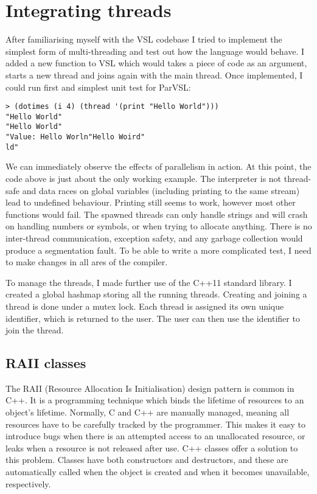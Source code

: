 \section{Integrating threads}
\label{sec:babythreads}
After familiarising myself with the VSL codebase I tried to implement the simplest form of
multi-threading and test out how the language would behave. I added a new function to VSL
which would takes a piece of code as an argument, starts a new thread and joins again with
the main thread. Once implemented, I could run first and simplest unit test for ParVSL:

\begin{verbatim}
> (dotimes (i 4) (thread '(print "Hello World")))
"Hello World"
"Hello World"
"Value: Hello Worln"Hello Woird"
ld"
\end{verbatim}

We can immediately observe the effects of parallelism in action. At this point, the code above
is just about the only working example. The interpreter is not thread-safe and data races
on global variables (including printing to the same stream) lead to undefined behaviour. Printing
still seems to work, however most other functions would fail. The spawned threads can only handle strings
and will crash on handling numbers or symbols, or when trying to allocate anything.
There is no inter-thread communication, exception safety, and any garbage collection would produce a segmentation
fault. To be able to write a more complicated test, I need to make changes in all ares of the compiler.

To manage the threads, I made further use of the C++11 standard library. I created a global hashmap storing
all the running threads. Creating and joining a thread is done under a mutex lock. Each thread is assigned its own unique
identifier, which is returned to the user. The user can then use the identifier to join the thread.

\subsection{RAII classes}
\label{sec:raii}
The RAII (Resource Allocation Is Initialisation) design pattern is common in C++. It is a programming
technique which binds the lifetime of resources to an object's lifetime. Normally,
C and C++ are manually managed, meaning all resources have to be carefully tracked by the programmer.
This makes it easy to introduce bugs when there is an attempted access to an unallocated resource,
or leaks when a resource is not released after use. C++ classes offer a solution to this problem.
Classes have both constructors and destructors, and these are automatically called when the object
is created and when it becomes unavailable, respectively.

